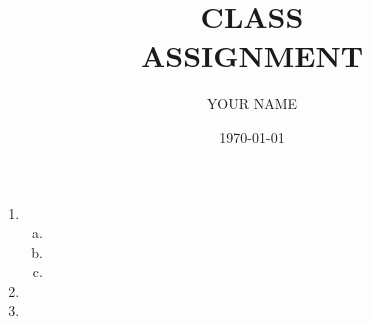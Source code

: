 \documentclass{article}
\begin{document}
\title{CLASS \\ ASSIGNMENT}
\author{YOUR NAME}
\date{\today}

\maketitle


\begin{enumerate}

\item \begin{enumerate}[(a)]

	\item

	\item

	\item
\end{enumerate}

\item

\item

\end{enumerate}
\end{document}
